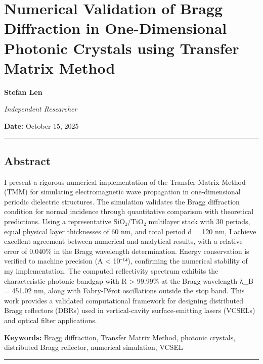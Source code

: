 \documentclass[
]{article}
\author{}
\date{}
\begin{document}
\section{Numerical Validation of Bragg Diffraction in One-Dimensional
Photonic Crystals using Transfer Matrix
Method}\label{numerical-validation-of-bragg-diffraction-in-one-dimensional-photonic-crystals-using-transfer-matrix-method}

\textbf{Stefan Len}

\emph{Independent Researcher}

\textbf{Date:} October 15, 2025

\begin{center}\rule{0.5\linewidth}{0.5pt}\end{center}

\subsection{Abstract}\label{abstract}

I present a rigorous numerical implementation of the Transfer Matrix
Method (TMM) for simulating electromagnetic wave propagation in
one-dimensional periodic dielectric structures. The simulation validates
the Bragg diffraction condition for normal incidence through
quantitative comparison with theoretical predictions. Using a
representative SiO₂/TiO₂ multilayer stack with 30 periods, equal
physical layer thicknesses of 60 nm, and total period d = 120 nm, I
achieve excellent agreement between numerical and analytical results,
with a relative error of 0.040\% in the Bragg wavelength determination.
Energy conservation is verified to machine precision
(\textbar A\textbar{} \textless{} 10⁻¹⁴), confirming the numerical
stability of my implementation. The computed reflectivity spectrum
exhibits the characteristic photonic bandgap with R \textgreater{}
99.99\% at the Bragg wavelength λ\_B = 451.02 nm, along with Fabry-Pérot
oscillations outside the stop band. This work provides a validated
computational framework for designing distributed Bragg reflectors
(DBRs) used in vertical-cavity surface-emitting lasers (VCSELs) and
optical filter applications.

\textbf{Keywords:} Bragg diffraction, Transfer Matrix Method, photonic
crystals, distributed Bragg reflector, numerical simulation, VCSEL

\begin{center}\rule{0.5\linewidth}{0.5pt}\end{center}
\end{document}
